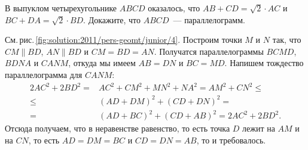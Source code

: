\problem
В выпуклом четырехугольнике $ABCD$ оказалось, что
$AB + CD = \sqrt{2} \cdot AC$
и
$BC + DA = \sqrt{2} \cdot BD$.
Докажите, что $ABCD$~--- параллелограмм.


%
\label{solution:2011/pers-geomt/junior/4}%
См.\,рис.\,\ref{fig:solution:2011/pers-geomt/junior/4}.
Построим точки $M$ и $N$ так, что
$CM \parallel BD$, $AN \parallel BD$ и $CM = BD = AN$.
Получатся параллелограммы $BCMD$, $BDNA$ и $CANM$, откуда мы
имеем $AB = DN$ и $BC = MD$.
Напишем тождество параллелограмма для $CANM$:
\begin{align*}
    2 AC^2 + 2 BD^2
={}&
    AC^2 + CM^2 + MN^2 + NA^2
=
    AM^2 + CN^2
\leq\\\leq{}&
    (AD + DM)^2 + (CD + DN)^2
=\\={}&
    (AD + BC)^2 + (CD + AB)^2
=
    2 AC^2 + 2 BD^2
.\end{align*}
Отсюда получаем, что в неравенстве равенство, то есть точка $D$ лежит на
$AM$ и на $CN$, то есть $AD = DM = BC$ и $CD = DN = AB$, то и требовалось.

\endproblem

